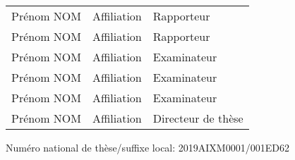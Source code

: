 {\begin{flushleft}
\end{flushleft}
\vspace{0.4cm}
\begin{tabular}{lll}
	Prénom NOM & Affiliation & Rapporteur \\
    \vspace{0.08cm}
	Prénom NOM & Affiliation & Rapporteur \\
    \vspace{0.08cm}
	Prénom NOM & Affiliation & Examinateur \\
    \vspace{0.08cm}
	Prénom NOM & Affiliation & Examinateur \\
    \vspace{0.08cm}
	Prénom NOM & Affiliation & Examinateur \\
    \vspace{0.08cm}
	Prénom NOM & Affiliation & Directeur de thèse \\
\end{tabular}

\vspace{0.4cm}
\begin{flushleft}\normalsize Numéro national de thèse/suffixe local: 2019AIXM0001/001ED62\\\end{flushleft}
}